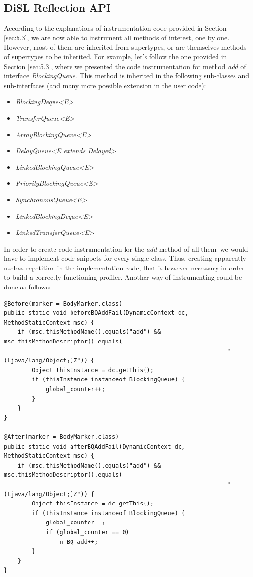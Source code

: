\documentclass[]{usiinfthesis}
\begin{document}
\subsection{DiSL Reflection API}
According to the explanations of instrumentation code provided in Section \ref{sec:5.3}, we are now able to instrument all methods of interest, one by one. However, most of them are inherited from supertypes, or are themselves methods of supertypes to be inherited. For example, let's follow the one provided in Section \ref{sec:5.3}, where we presented the code instrumentation for method \textit{add} of interface \textit{BlockingQueue}. This method is inherited in the following sub-classes and sub-interfaces (and many more possible extension in the user code):  
\begin{itemize}
    \item \textit{BlockingDeque<E>}
    \item \textit{TransferQueue<E>}
    \item \textit{ArrayBlockingQueue<E>}
    \item \textit{DelayQueue<E extends Delayed>}
    \item \textit{LinkedBlockingQueue<E>}
    \item \textit{PriorityBlockingQueue<E>}
    \item \textit{SynchronousQueue<E>}
    \item \textit{LinkedBlockingDeque<E>}
    \item \textit{LinkedTransferQueue<E>}
\end{itemize}
In order to create code instrumentation for the \textit{add} method of all them, we would have to implement code snippets for every single class. Thus, creating apparently useless repetition in the implementation code, that is however necessary in order to build a correctly functioning profiler. Another way of instrumenting could be done as follows:

\vspace*{0.5cm}
\begin{verbatim}
@Before(marker = BodyMarker.class)
public static void beforeBQAddFail(DynamicContext dc, MethodStaticContext msc) {
    if (msc.thisMethodName().equals("add") && msc.thisMethodDescriptor().equals(
                                                                "(Ljava/lang/Object;)Z")) {
        Object thisInstance = dc.getThis();
        if (thisInstance instanceof BlockingQueue) {
            global_counter++;
        }
    }
}

@After(marker = BodyMarker.class)
public static void afterBQAddFail(DynamicContext dc, MethodStaticContext msc) {
    if (msc.thisMethodName().equals("add") && msc.thisMethodDescriptor().equals(
                                                                "(Ljava/lang/Object;)Z")) {
        Object thisInstance = dc.getThis();
        if (thisInstance instanceof BlockingQueue) {
            global_counter--;
            if (global_counter == 0)
                n_BQ_add++;
        }
    }
}
\end{verbatim}
\vspace*{0.5cm}
\end{document}
